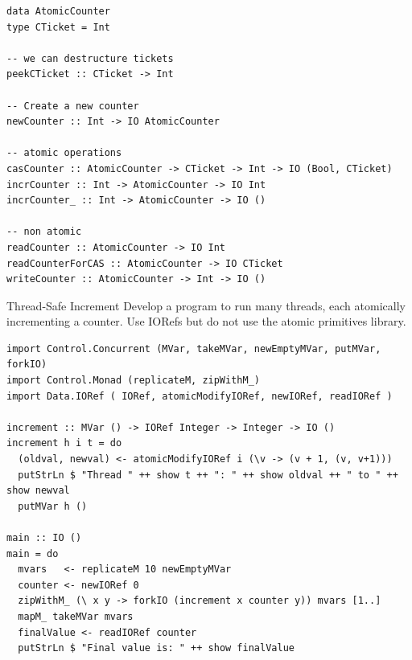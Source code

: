 \begin{verbatim}
data AtomicCounter
type CTicket = Int

-- we can destructure tickets
peekCTicket :: CTicket -> Int

-- Create a new counter
newCounter :: Int -> IO AtomicCounter

-- atomic operations
casCounter :: AtomicCounter -> CTicket -> Int -> IO (Bool, CTicket)
incrCounter :: Int -> AtomicCounter -> IO Int
incrCounter_ :: Int -> AtomicCounter -> IO ()

-- non atomic
readCounter :: AtomicCounter -> IO Int
readCounterForCAS :: AtomicCounter -> IO CTicket
writeCounter :: AtomicCounter -> Int -> IO ()
\end{verbatim}

\begin{examplebox}{Thread-Safe Increment}
    Develop a program to run many threads, each atomically incrementing a counter. Use IORefs but do not use the atomic primitives library.
    \tcblower
    \begin{verbatim}
import Control.Concurrent (MVar, takeMVar, newEmptyMVar, putMVar, forkIO)
import Control.Monad (replicateM, zipWithM_)
import Data.IORef ( IORef, atomicModifyIORef, newIORef, readIORef )

increment :: MVar () -> IORef Integer -> Integer -> IO ()
increment h i t = do
  (oldval, newval) <- atomicModifyIORef i (\v -> (v + 1, (v, v+1)))
  putStrLn $ "Thread " ++ show t ++ ": " ++ show oldval ++ " to " ++ show newval
  putMVar h ()

main :: IO ()
main = do
  mvars   <- replicateM 10 newEmptyMVar
  counter <- newIORef 0
  zipWithM_ (\ x y -> forkIO (increment x counter y)) mvars [1..]
  mapM_ takeMVar mvars
  finalValue <- readIORef counter
  putStrLn $ "Final value is: " ++ show finalValue    
    \end{verbatim}
\end{examplebox}
